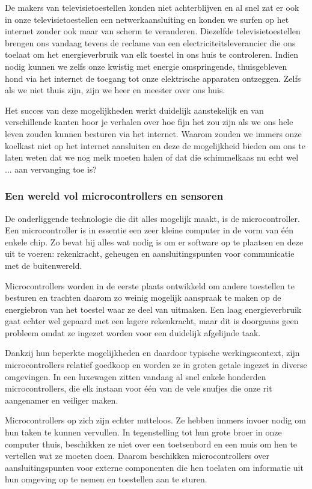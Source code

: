 \documentclass[DIV=calc,paper=a4,fontsize=11pt,twocolumn]{scrartcl}
\newcommand{\heading}[1]{
\vspace{-5mm}
\subsubsection*{#1}
\vspace{-2mm}
}
\begin{document}
De makers van televisietoestellen konden niet achterblijven en al snel zat er
ook in onze televisietoestellen een netwerkaansluiting en konden we surfen op
het internet zonder ook maar van scherm te veranderen. Diezelfde
televisietoestellen brengen ons vandaag tevens de reclame van een
electriciteitsleverancier die ons toelaat om het energieverbruik van elk
toestel in ons huis te controleren. Indien nodig kunnen we zelfs onze kwistig
met energie omspringende, thuisgebleven hond via het internet de toegang tot
onze elektrische apparaten ontzeggen. Zelfs als we niet thuis zijn, zijn we
heer en meester over ons huis.

Het succes van deze mogelijkheden werkt duidelijk aanstekelijk en van
verschillende kanten hoor je verhalen over hoe fijn het zou zijn als we ons
hele leven zouden kunnen besturen via het internet. Waarom zouden we immers
onze koelkast niet op het internet aansluiten en deze de mogelijkheid bieden om
ons te laten weten dat we nog melk moeten halen of dat die schimmelkaas nu echt
wel ... aan vervanging toe is?

\heading{Een wereld vol microcontrollers en sensoren}

De onderliggende technologie die dit alles mogelijk maakt, is de
microcontroller. Een microcontroller is in essentie een zeer kleine computer in
de vorm van \'e\'en enkele chip. Zo bevat hij alles wat nodig is om er software
op te plaatsen en deze uit te voeren: rekenkracht, geheugen en
aansluitingspunten voor communicatie met de buitenwereld.

Microcontrollers worden in de eerste plaats ontwikkeld om andere toestellen te
besturen en trachten daarom zo weinig mogelijk aanspraak te maken op de
energiebron van het toestel waar ze deel van uitmaken. Een laag energieverbruik
gaat echter wel gepaard met een lagere rekenkracht, maar dit is doorgaans geen
probleem omdat ze ingezet worden voor een duidelijk afgelijnde taak.

Dankzij hun beperkte mogelijkheden en daardoor typische werkingscontext, zijn
microcontrollers relatief goedkoop en worden ze in groten getale ingezet in
diverse omgevingen. In een luxewagen zitten vandaag al snel enkele honderden
microcontrollers, die elk instaan voor \'e\'en van de vele snufjes die onze rit
aangenamer en veiliger maken.

Microcontrollers op zich zijn echter nutteloos. Ze hebben immers invoer nodig
om hun taken te kunnen vervullen. In tegenstelling tot hun grote broer in onze
computer thuis, beschikken ze niet over een toetsenbord en een muis om hen te
vertellen wat ze moeten doen. Daarom beschikken microcontrollers over
aansluitingspunten voor externe componenten die hen toelaten om informatie uit
hun omgeving op te nemen en toestellen aan te sturen.
\end{document}
